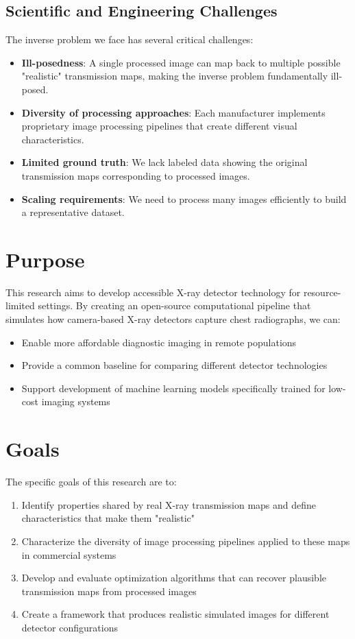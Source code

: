 \documentclass[nomenclature, english, bibtex]{kththesis}
\numberwithin{listing}{chapter}
\begin{document}
\subsection{Scientific and Engineering Challenges}
The inverse problem we face has several critical challenges:
\begin{itemize}
    \item \textbf{Ill-posedness}: A single processed image can map back to multiple possible "realistic" transmission maps, making the inverse problem fundamentally ill-posed.
    \item \textbf{Diversity of processing approaches}: Each manufacturer implements proprietary image processing pipelines that create different visual characteristics.
    \item \textbf{Limited ground truth}: We lack labeled data showing the original transmission maps corresponding to processed images.
    \item \textbf{Scaling requirements}: We need to process many images efficiently to build a representative dataset.
\end{itemize}

\section{Purpose}
This research aims to develop accessible X-ray detector technology for resource-limited settings. By creating an open-source computational pipeline that simulates how camera-based X-ray detectors capture chest radiographs, we can:
\begin{itemize}
    \item Enable more affordable diagnostic imaging in remote populations
    \item Provide a common baseline for comparing different detector technologies
    \item Support development of machine learning models specifically trained for low-cost imaging systems
\end{itemize}

\section{Goals}
The specific goals of this research are to:
\begin{enumerate}
    \item Identify properties shared by real X-ray transmission maps and define characteristics that make them "realistic"
    \item Characterize the diversity of image processing pipelines applied to these maps in commercial systems
    \item Develop and evaluate optimization algorithms that can recover plausible transmission maps from processed images
    \item Create a framework that produces realistic simulated images for different detector configurations
\end{enumerate}
\end{document}
